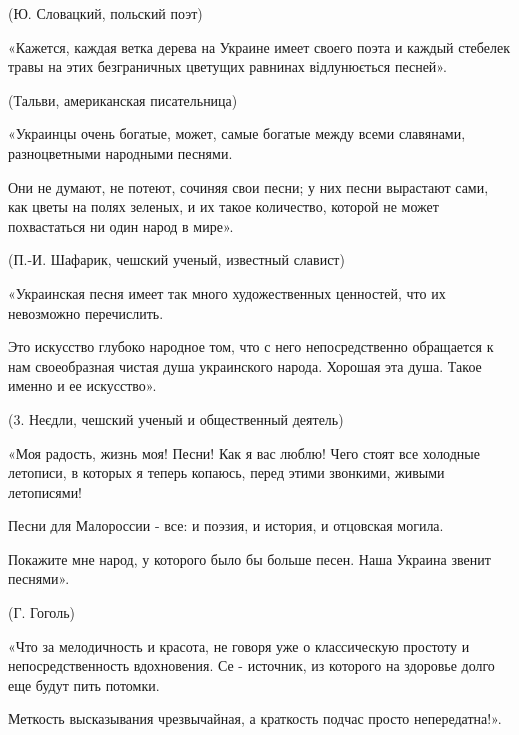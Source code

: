 (Ю. Словацкий, польский поэт)



«Кажется, каждая ветка дерева на Украине имеет своего поэта и каждый стебелек травы на этих безграничных цветущих равнинах відлунюється песней».



(Тальви, американская писательница)



«Украинцы очень богатые, может, самые богатые между всеми славянами, разноцветными народными песнями.



Они не думают, не потеют, сочиняя свои песни; у них песни вырастают сами, как цветы на полях зеленых, и их такое количество, которой не может похвастаться ни один народ в мире».



(П.-И. Шафарик, чешский ученый, известный славист)



«Украинская песня имеет так много художественных ценностей, что их невозможно перечислить.



Это искусство глубоко народное том, что с него непосредственно обращается к нам своеобразная чистая душа украинского народа. Хорошая эта душа. Такое именно и ее искусство».



(3. Неєдли, чешский ученый и общественный деятель)



«Моя радость, жизнь моя! Песни! Как я вас люблю! Чего стоят все холодные летописи, в которых я теперь копаюсь, перед этими звонкими, живыми летописями!



Песни для Малороссии - все: и поэзия, и история, и отцовская могила.



Покажите мне народ, у которого было бы больше песен. Наша Украина звенит песнями».



(Г. Гоголь)



«Что за мелодичность и красота, не говоря уже о классическую простоту и непосредственность вдохновения. Се - источник, из которого на здоровье долго еще будут пить потомки.



Меткость высказывания чрезвычайная, а краткость подчас просто непередатна!».



